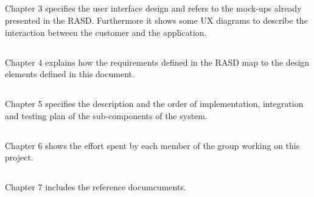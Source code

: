         \subsection*{}
        Chapter 3 specifies the user interface design and refers to the mock-ups
        already presented in the RASD. Furthermore it shows some UX diagrams to
        describe the interaction between the customer and the application.

        \subsection*{}
        Chapter 4 explains how the requirements defined in the RASD map to the
        design elements defined in this document.

        \subsection*{}
        Chapter 5 specifies the description and the order of implementation,
        integration and testing plan of the sub-components of the system.
        
        \subsection*{}
        Chapter 6 shows the effort spent by each member of the group working on
        this project.
    
        \subsection*{}
        Chapter 7 includes the reference documcuments.
        